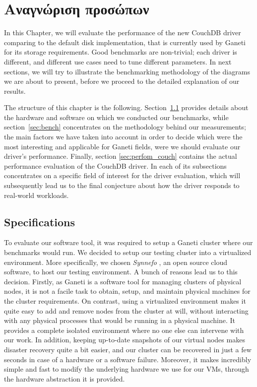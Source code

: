 \chapter{Αναγνώριση προσώπων}\label{ch:facerec}

In this Chapter, we will evaluate the performance of the new CouchDB driver
comparing to the default disk implementation, that is currently used by Ganeti
for its storage requirements. Good benchmarks are non-trivial; each driver is
different, and different use cases need to tune different parameters. In next
sections, we will try to illustrate the benchmarking methodology of the diagrams
we are about to present, before we proceed to the detailed explanation of our
results.

The structure of this chapter is the following. Section~\ref{sec:specs} provides
details about the hardware and software on which we conducted our benchmarks,
while section~\ref{sec:bench} concentrates on the methodology behind our
measurements; the main factors we have taken into account in order to
decide which were the most interesting and applicable for Ganeti fields, were we
should evaluate our driver's performance. Finally, section
\ref{sec:perfom_couch} contains the actual performance evaluation of the CouchDB
driver. In each of its subsections concentrates on a specific field of interest
for the driver evaluation, which will subsequently lead us to the final
conjecture about how the driver responds to real-world workloads.

\section{Specifications}\label{sec:specs}

To evaluate our software tool, it was required to setup a Ganeti
cluster where our benchmarks would run. We decided to setup our testing cluster
into a virtualized environment. More specifically, we chosen \emph{Synnefo}
, an open source cloud software, to host our
testing environment. A bunch of reasons lead us to this decision. Firstly, as
Ganeti is a software tool for managing clusters of physical nodes, it is not a
facile task to obtain, setup, and maintain physical machines for the cluster
requirements. On contrast, using a virtualized environment makes it quite easy
to add and remove nodes from the cluster at will, without interacting with any
physical processes that would be running in a physical machine. It
provides a complete isolated environment where no one else can intervene with
our work. In addition, keeping up-to-date snapshots of our virtual nodes makes
disaster recovery quite a bit easier, and our cluster can be recovered in just a
few seconds in case of a hardware or a software failure. Moreover, it makes
incredibly simple and fast to modify the underlying hardware we use for our VMs,
through the hardware abstraction it is provided.

